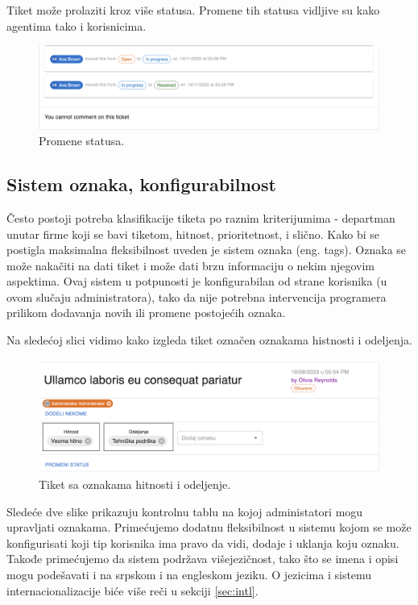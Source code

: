 \documentclass[12pt,oneside]{memoir}
\begin{document}
Tiket može prolaziti kroz više statusa. Promene tih statusa vidljive su kako agentima tako i korisnicima.

\begin{figure}[h]
  \centering
  \includegraphics[width=1\textwidth]{docs/images/ch_1/ticket-statuses.png} 
  \caption{Promene statusa.}
\end{figure}

\subsection{Sistem oznaka, konfigurabilnost}
\label{sec:tagsystem}

Često postoji potreba klasifikacije tiketa po raznim kriterijumima - departman unutar firme koji se bavi tiketom, hitnost, prioritetnost, i slično. Kako bi se postigla maksimalna fleksibilnost uveden je sistem oznaka (eng. tags). Oznaka se može nakačiti na dati tiket i može dati brzu informaciju o nekim njegovim aspektima. Ovaj sistem u potpunosti je konfigurabilan od strane korisnika (u ovom slučaju administratora), tako da nije potrebna intervencija programera prilikom dodavanja novih ili promene postojećih oznaka.

Na sledećoj slici vidimo kako izgleda tiket označen oznakama histnosti i odeljenja.

\begin{figure}[h]
  \centering
  \includegraphics[width=1\textwidth]{docs/images/ch_1/tagged-ticket.png} 
  \caption{Tiket sa oznakama hitnosti i odeljenje.}
\end{figure}

Sledeće dve slike prikazuju kontrolnu tablu na kojoj administatori mogu upravljati oznakama. Primećujemo dodatnu fleksibilnost u sistemu kojom se može konfigurisati koji tip korisnika ima pravo da vidi, dodaje i uklanja koju oznaku. Takođe primećujemo da sistem podržava višejezičnost, tako što se imena i opisi mogu podešavati i na srpskom i na engleskom jeziku. O jezicima i sistemu internacionalizacije biće više reči u sekciji \ref{sec:intl}.
\end{document}
